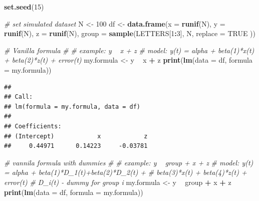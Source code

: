 \documentclass[11pt,]{book}
\newenvironment{Shaded}{\begin{snugshade}}{\end{snugshade}}
\newcommand{\KeywordTok}[1]{\textcolor[rgb]{0.27,0.27,0.27}{\textbf{#1}}}
\newcommand{\DataTypeTok}[1]{\textcolor[rgb]{0.27,0.27,0.27}{#1}}
\newcommand{\DecValTok}[1]{\textcolor[rgb]{0.06,0.06,0.06}{#1}}
\newcommand{\StringTok}[1]{\textcolor[rgb]{0.5,0.5,0.5}{#1}}
\newcommand{\CommentTok}[1]{\textcolor[rgb]{0.56,0.35,0.01}{\textit{#1}}}
\newcommand{\OtherTok}[1]{\textcolor[rgb]{0.56,0.35,0.01}{#1}}
\newcommand{\OperatorTok}[1]{\textcolor[rgb]{0.81,0.36,0.00}{\textbf{#1}}}
\newcommand{\NormalTok}[1]{#1}
\begin{document}
\begin{Shaded}
\begin{Highlighting}[]
\KeywordTok{set.seed}\NormalTok{(}\DecValTok{15}\NormalTok{)}

\CommentTok{# set simulated dataset}
\NormalTok{N <-}\StringTok{ }\DecValTok{100}
\NormalTok{df <-}\StringTok{ }\KeywordTok{data.frame}\NormalTok{(}\DataTypeTok{x =} \KeywordTok{runif}\NormalTok{(N),}
                 \DataTypeTok{y =} \KeywordTok{runif}\NormalTok{(N),}
                 \DataTypeTok{z =} \KeywordTok{runif}\NormalTok{(N),}
                 \DataTypeTok{group =} \KeywordTok{sample}\NormalTok{(LETTERS[}\DecValTok{1}\OperatorTok{:}\DecValTok{3}\NormalTok{],}
\NormalTok{                                N,}
                                \DataTypeTok{replace =} \OtherTok{TRUE}\NormalTok{ ))}

\CommentTok{# Vanilla formula}
\CommentTok{#}
\CommentTok{# example: y ~ x + z}
\CommentTok{# model: y(t) = alpha + beta(1)*x(t) + beta(2)*z(t) + error(t)}
\NormalTok{my.formula <-}\StringTok{ }\NormalTok{y }\OperatorTok{~}\StringTok{ }\NormalTok{x }\OperatorTok{+}\StringTok{ }\NormalTok{z}
\KeywordTok{print}\NormalTok{(}\KeywordTok{lm}\NormalTok{(}\DataTypeTok{data =}\NormalTok{ df, }
         \DataTypeTok{formula =}\NormalTok{ my.formula))}
\end{Highlighting}
\end{Shaded}

\begin{verbatim}
## 
## Call:
## lm(formula = my.formula, data = df)
## 
## Coefficients:
## (Intercept)            x            z  
##     0.44971      0.14223     -0.03781
\end{verbatim}

\begin{Shaded}
\begin{Highlighting}[]
\CommentTok{# vannila formula with dummies}
\CommentTok{#}
\CommentTok{# example: y ~ group + x + z}
\CommentTok{# model: y(t) = alpha + beta(1)*D_1(t)+beta(2)*D_2(t) + }
\CommentTok{#               beta(3)*x(t) + beta(4)*z(t) + error(t)}
\CommentTok{# D_i(t) - dummy for group i}
\NormalTok{my.formula <-}\StringTok{ }\NormalTok{y }\OperatorTok{~}\StringTok{ }\NormalTok{group }\OperatorTok{+}\StringTok{ }\NormalTok{x }\OperatorTok{+}\StringTok{ }\NormalTok{z}
\KeywordTok{print}\NormalTok{(}\KeywordTok{lm}\NormalTok{(}\DataTypeTok{data =}\NormalTok{ df, }
         \DataTypeTok{formula =}\NormalTok{ my.formula))}
\end{Highlighting}
\end{Shaded}
\end{document}
